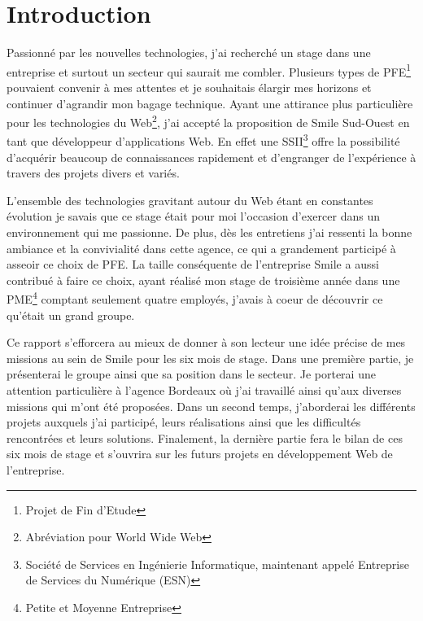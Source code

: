\documentclass[a4paper,11pt,twoside]{report}
\begin{document}
\sffamily

\clearpage

\chapter*{Introduction}
\thispagestyle{\chead{}}
Passionné  par les nouvelles technologies, j'ai recherché un stage dans une entreprise et surtout un secteur qui saurait me combler. Plusieurs types de PFE\footnote{Projet de Fin d'Etude} pouvaient convenir à mes attentes et je souhaitais élargir mes horizons et continuer d'agrandir mon bagage technique. Ayant une attirance plus particulière pour les technologies du Web\footnote{Abréviation pour World Wide Web}, j'ai accepté la proposition de Smile Sud-Ouest en tant que développeur d'applications Web. En effet une SSII\footnote{Société de Services en Ingénierie Informatique, maintenant appelé Entreprise de Services du Numérique (ESN)} offre la possibilité d'acquérir beaucoup de connaissances rapidement et d'engranger de l'expérience à travers des projets divers et variés.\newline

L'ensemble des technologies gravitant autour du Web étant en constantes évolution je savais que ce stage était pour moi l'occasion d'exercer dans un environnement qui me passionne. De plus, dès les entretiens j'ai ressenti la bonne ambiance et la convivialité dans cette agence, ce qui a grandement participé à asseoir ce choix de PFE. La taille conséquente de l'entreprise Smile a aussi contribué à faire ce choix, ayant réalisé mon stage de troisième année dans une PME\footnote{Petite et Moyenne Entreprise} comptant seulement quatre employés, j'avais à coeur de découvrir ce qu'était un grand groupe.\newline 

Ce rapport s’efforcera au mieux de donner à son lecteur une idée précise de mes missions au sein de Smile pour les six mois de stage. Dans une première partie, je présenterai le groupe ainsi que sa position dans le secteur. Je porterai une attention particulière à l'agence Bordeaux où j'ai travaillé ainsi qu'aux diverses missions qui m'ont été proposées. Dans un second temps, j’aborderai les différents projets auxquels j'ai participé, leurs réalisations ainsi que les difficultés rencontrées et leurs solutions. Finalement, la dernière partie fera le bilan de ces six mois de stage et s'ouvrira sur les futurs projets en développement Web de l’entreprise.
\end{document}
